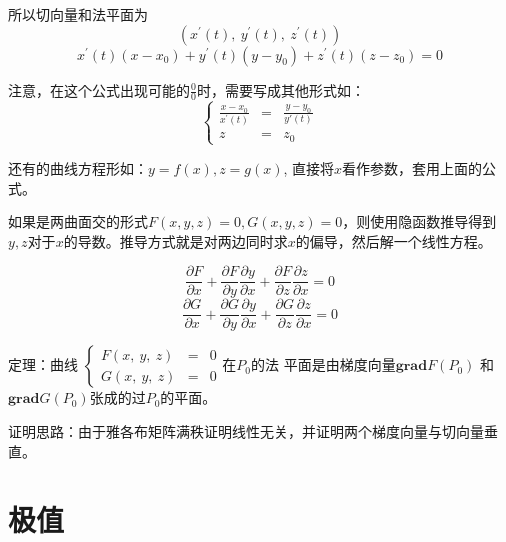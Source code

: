 \documentclass[10pt, a4paper]{article}
\begin{document}
                所以切向量和法平面为
                \begin{equation}
                    (x^{'}(t),\ y^{'}(t),\ z^{'}(t))
                \end{equation}
                \begin{equation}
                    x^{'}(t)(x - x_0) + y^{'}(t)(y - y_0) + z^{'}(t)(z - z_0) = 0 
                \end{equation}
                
                注意，在这个公式出现可能的$\frac{0}{0}$时，需要写成其他形式如：
                $$
                    \left\{
                        \begin{aligned}
                            \frac{x - x_0}{x^{'}(t)} & = & \frac{y - y_0}{y'(t)} \\
                            z&=&z_0
                        \end{aligned}
                        \right.
                $$
                
                还有的曲线方程形如：$y = f(x), z = g(x)$, 直接将$x$看作参数，套用上面的公式。
                
                如果是两曲面交的形式$F(x, y, z) = 0, G(x, y, z) = 0$，则使用隐函数推导得到$y, z$对于$x$的导数。推导方式就是对两边同时求$x$的偏导，然后解一个线性方程。
                
                $$
                    \frac{\partial F}{\partial x} + \frac{\partial F}{\partial y}\frac{\partial y}{\partial x} + \frac{\partial F}{\partial z}\frac{\partial z}{\partial x} = 0
                $$
                $$
                    \frac{\partial G}{\partial x} + \frac{\partial G}{\partial y}\frac{\partial y}{\partial x} + \frac{\partial G}{\partial z}\frac{\partial z}{\partial x} = 0
                $$ 
                
                定理：曲线
                $
                    \left\{
                        \begin{aligned}
                            F(x,\ y,\ z) & = & 0 \\
                            G(x,\ y,\ z) & = & 0
                        \end{aligned}
                    \right.
                $在$P_0$的法 平面是由梯度向量$\textbf{grad}F(P_0)$ 和 $\textbf{grad}G(P_0)$张成的过$P_0$的平面。
                
                证明思路：由于雅各布矩阵满秩证明线性无关，并证明两个梯度向量与切向量垂直。
    \section{极值}
\end{document}
